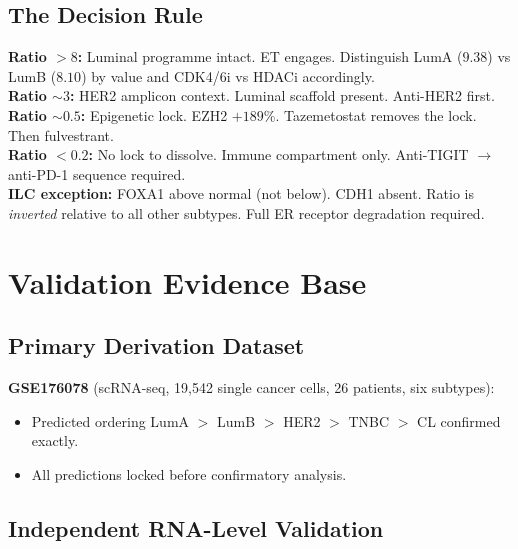 \documentclass[12pt, a4paper]{article}
\begin{document}
\subsection{The Decision Rule}

\begin{center}
\colorbox{mechanismbox}{
\begin{minipage}{0.88\textwidth}
\vspace{0.5em}
\textbf{Ratio $>8$:} Luminal programme intact.
ET engages. Distinguish LumA ($9.38$) vs LumB
($8.10$) by value and CDK4/6i vs HDACi
accordingly.\\[0.4em]
\textbf{Ratio ${\sim}3$:} HER2 amplicon context.
Luminal scaffold present. Anti-HER2 first.\\[0.4em]
\textbf{Ratio ${\sim}0.5$:} Epigenetic lock.
EZH2 $+189\%$. Tazemetostat removes the lock.
Then fulvestrant.\\[0.4em]
\textbf{Ratio $<0.2$:} No lock to dissolve.
Immune compartment only. Anti-TIGIT $\rightarrow$
anti-PD-1 sequence required.\\[0.4em]
\textbf{ILC exception:} FOXA1 above normal
(not below). CDH1 absent. Ratio is
\textit{inverted} relative to all other subtypes.
Full ER receptor degradation required.
\vspace{0.5em}
\end{minipage}}
\end{center}

\section{Validation Evidence Base}

\subsection{Primary Derivation Dataset}

\textbf{GSE176078} (scRNA-seq, 19,542 single
cancer cells, 26 patients, six subtypes):
\begin{itemize}
    \item Predicted ordering LumA $>$ LumB
    $>$ HER2 $>$ TNBC $>$ CL confirmed exactly.
    \item All predictions locked before
    confirmatory analysis.
\end{itemize}

\subsection{Independent RNA-Level Validation}
\end{document}
